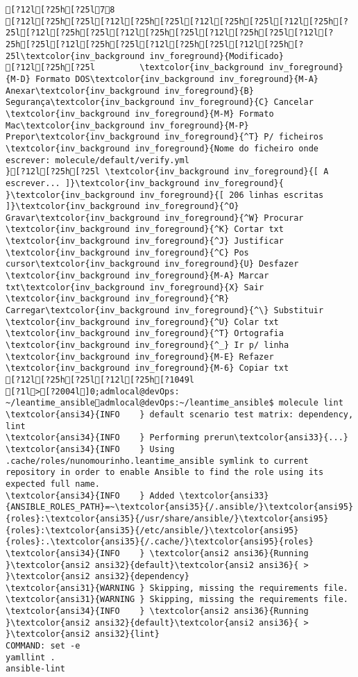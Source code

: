 \documentclass{scrartcl}
\begin{document}
\begin{Verbatim}
[?12l[?25h[?25l78
[?12l[?25h[?25l[?12l[?25h[?25l[?12l[?25h[?25l[?12l[?25h[?25l[?12l[?25h[?25l[?12l[?25h[?25l[?12l[?25h[?25l[?12l[?25h[?25l[?12l[?25h[?25l[?12l[?25h[?25l[?12l[?25h[?25l\textcolor{inv_background inv_foreground}{Modificado}
[?12l[?25h[?25l         \textcolor{inv_background inv_foreground}{M-D} Formato DOS\textcolor{inv_background inv_foreground}{M-A} Anexar\textcolor{inv_background inv_foreground}{B} Segurança\textcolor{inv_background inv_foreground}{C} Cancelar           \textcolor{inv_background inv_foreground}{M-M} Formato Mac\textcolor{inv_background inv_foreground}{M-P} Prepor\textcolor{inv_background inv_foreground}{^T} P/ ficheiros
\textcolor{inv_background inv_foreground}{Nome do ficheiro onde escrever: molecule/default/verify.yml                                                                               }[?12l[?25h[?25l \textcolor{inv_background inv_foreground}{[ A escrever... ]}\textcolor{inv_background inv_foreground}{          }\textcolor{inv_background inv_foreground}{[ 206 linhas escritas ]}\textcolor{inv_background inv_foreground}{^O} Gravar\textcolor{inv_background inv_foreground}{^W} Procurar      \textcolor{inv_background inv_foreground}{^K} Cortar txt    \textcolor{inv_background inv_foreground}{^J} Justificar    \textcolor{inv_background inv_foreground}{^C} Pos cursor\textcolor{inv_background inv_foreground}{U} Desfazer     \textcolor{inv_background inv_foreground}{M-A} Marcar txt\textcolor{inv_background inv_foreground}{X} Sair    \textcolor{inv_background inv_foreground}{^R} Carregar\textcolor{inv_background inv_foreground}{^\} Substituir    \textcolor{inv_background inv_foreground}{^U} Colar txt     \textcolor{inv_background inv_foreground}{^T} Ortografia    \textcolor{inv_background inv_foreground}{^_} Ir p/ linha   \textcolor{inv_background inv_foreground}{M-E} Refazer      \textcolor{inv_background inv_foreground}{M-6} Copiar txt
[?12l[?25h[?25l[?12l[?25h[?1049l
[?1l>[?2004l]0;admlocal@devOps: ~/leantime_ansibleadmlocal@devOps:~/leantime_ansible$ molecule lint
\textcolor{ansi34}{INFO    } default scenario test matrix: dependency, lint
\textcolor{ansi34}{INFO    } Performing prerun\textcolor{ansi33}{...}
\textcolor{ansi34}{INFO    } Using .cache/roles/nunomourinho.leantime_ansible symlink to current repository in order to enable Ansible to find the role using its expected full name.
\textcolor{ansi34}{INFO    } Added \textcolor{ansi33}{ANSIBLE_ROLES_PATH}=~\textcolor{ansi35}{/.ansible/}\textcolor{ansi95}{roles}:\textcolor{ansi35}{/usr/share/ansible/}\textcolor{ansi95}{roles}:\textcolor{ansi35}{/etc/ansible/}\textcolor{ansi95}{roles}:.\textcolor{ansi35}{/.cache/}\textcolor{ansi95}{roles}
\textcolor{ansi34}{INFO    } \textcolor{ansi2 ansi36}{Running }\textcolor{ansi2 ansi32}{default}\textcolor{ansi2 ansi36}{ > }\textcolor{ansi2 ansi32}{dependency}
\textcolor{ansi31}{WARNING } Skipping, missing the requirements file.
\textcolor{ansi31}{WARNING } Skipping, missing the requirements file.
\textcolor{ansi34}{INFO    } \textcolor{ansi2 ansi36}{Running }\textcolor{ansi2 ansi32}{default}\textcolor{ansi2 ansi36}{ > }\textcolor{ansi2 ansi32}{lint}
COMMAND: set -e
yamllint .
ansible-lint


\end{Verbatim}
\end{document}
